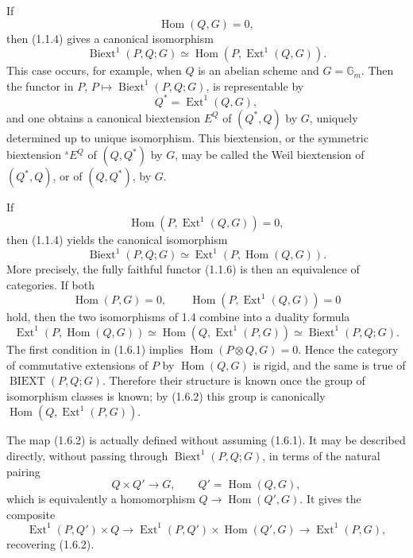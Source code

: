 \documentclass[11pt]{article}
\providecommand{\Gm}{\mathbb G_m}
\providecommand{\Hom}{\operatorname{Hom}}
\providecommand{\Ext}{\operatorname{Ext}}
\providecommand{\Biext}{\operatorname{Biext}}
\providecommand{\Ext}{\operatorname{Ext}}
\begin{document}
If
\begin{equation}\tag{1.4.1}
        \Hom(Q,G)=0,
\end{equation}
then (1.1.4) gives a canonical isomorphism
\begin{equation}\tag{1.4.2}
        \Biext^1(P,Q;G)\simeq\Hom(P,\Ext^1(Q,G)).
\end{equation}
This case occurs, for example, when \(Q\) is an abelian scheme and \(G=\Gm\).  Then the functor in \(P\), \(P\mapsto\Biext^1(P,Q;G)\), is representable by
\[
        Q^*=\Ext^1(Q,G),
\]
and one obtains a canonical biextension \(E^Q\) of \((Q^*,Q)\) by \(G\), uniquely determined up to unique isomorphism.  This biextension, or the symmetric biextension \({}^sE^Q\) of \((Q,Q^*)\) by \(G\), may be called the Weil biextension of \((Q^*,Q)\), or of \((Q,Q^*)\), by \(G\).

If
\begin{equation}\tag{1.5.1}
        \Hom(P,\Ext^1(Q,G))=0,
\end{equation}
then (1.1.4) yields the canonical isomorphism
\begin{equation}\tag{1.5.2}
        \Biext^1(P,Q;G)\simeq \Ext^1(P,\Hom(Q,G)).
\end{equation}
More precisely, the fully faithful functor (1.1.6) is then an equivalence of categories.  If both
\begin{equation}\tag{1.6.1}
        \Hom(P,G)=0,
        \qquad
        \Hom(P,\Ext^1(Q,G))=0
\end{equation}
hold, then the two isomorphisms of 1.4 combine into a duality formula
\begin{equation}\tag{1.6.2}
        \Ext^1(P,\Hom(Q,G))
        \simeq \Hom(Q,\Ext^1(P,G))
        \simeq \Biext^1(P,Q;G).
\end{equation}
The first condition in (1.6.1) implies \(\Hom(P\otimes Q,G)=0\).  Hence the category of commutative extensions of \(P\) by \(\Hom(Q,G)\) is rigid, and the same is true of \(\operatorname{BIEXT}(P,Q;G)\).  Therefore their structure is known once the group of isomorphism classes is known; by (1.6.2) this group is canonically \(\Hom(Q,\Ext^1(P,G))\).

The map (1.6.2) is actually defined without assuming (1.6.1).  It may be described directly, without passing through \(\Biext^1(P,Q;G)\), in terms of the natural pairing
\[
        Q\times Q'\longrightarrow G,
        \qquad Q'=\Hom(Q,G),
\]
which is equivalently a homomorphism \(Q\to\Hom(Q',G)\).  It gives the composite
\begin{equation}\tag{1.6.3}
        \Ext^1(P,Q')\times Q
        \longrightarrow \Ext^1(P,Q')\times\Hom(Q',G)
        \longrightarrow \Ext^1(P,G),
\end{equation}
recovering (1.6.2).
\end{document}

